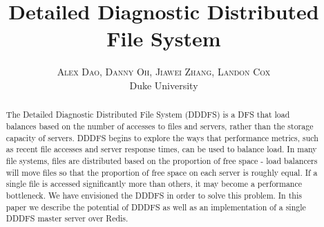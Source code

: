 \documentclass[twoside]{article}
\title{\vspace{-15mm}\fontsize{24pt}{10pt}\selectfont\textbf{Detailed Diagnostic Distributed File System}} %
\author{
\large
\textsc{Alex Dao, Danny Oh, Jiawei Zhang, Landon Cox}\\[2mm] %
\normalsize Duke University \\ %
\vspace{-5mm}
}
\date{}
\begin{document}
\maketitle %

\thispagestyle{fancy} %


\begin{abstract}

\noindent The Detailed Diagnostic Distributed File System (DDDFS) is a DFS that load balances based on the number of accesses to files and servers, rather than the storage capacity of servers. DDDFS begins to explore the ways that performance metrics, such as recent file accesses and server response times, can be used to balance load. In many file systems, files are distributed based on the proportion of free space - load balancers will move files so that the proportion of free space on each server is roughly equal. If a single file is accessed significantly more than others, it may become a performance bottleneck. We have envisioned the DDDFS in order to solve this problem. In this paper we describe the potential of DDDFS as well as an implementation of a single DDDFS master server over Redis.

\end{abstract}

\end{document}
